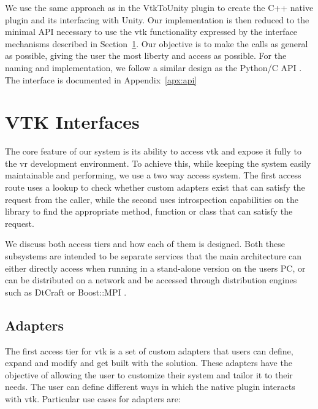 
We use the same approach as in the VtkToUnity plugin to create the C++ native plugin and its interfacing with Unity. Our implementation is then reduced to the minimal API necessary to use the \acrshort{vtk} functionality expressed by the interface mechanisms described in Section~\ref{sec:design-interfaces}. Our objective is to make the calls as general as possible, giving the user the most liberty and access as possible. For the naming and implementation, we follow a similar design as the Python/C API \cite{python_c_api}. The interface is documented in Appendix~\ref{apx:api}

\section{VTK Interfaces}
\label{sec:design-interfaces}

The core feature of our system is its ability to access \acrshort{vtk} and expose it fully to the \acrshort{vr} development environment. To achieve this, while keeping the system easily maintainable and performing, we use a two way access system. The first access route uses a lookup to check whether custom adapters exist that can satisfy the request from the caller, while the second uses introspection capabilities on the library to find the appropriate method, function or class that can satisfy the request.

We discuss both access tiers and how each of them is designed. Both these subsystems are intended to be separate services that the main architecture can either directly access when running in a stand-alone version on the users PC, or can be distributed on a network and be accessed through distribution engines such as DtCraft \cite{huang2017dtcraft} or Boost::MPI \cite{schaling2011boost}.

\subsection{Adapters}
\label{sec:design-adapters}

The first access tier for \acrshort{vtk} is a set of custom adapters that users can define, expand and modify and get built with the solution. These adapters have the objective of allowing the user to customize their system and tailor it to their needs. The user can define different ways in which the native plugin interacts with \acrshort{vtk}. 
Particular use cases for adapters are:

